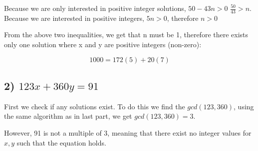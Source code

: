 \documentclass[12pt]{article} %
\begin{document}
\begin{homeworkProblem}
    Because we are only interested in positive integer solutions, $50 - 43n > 0$ $\frac{50}{43} > n$. Because we are interested in positive integers, $5n > 0$, therefore $n > 0$

    From the above two inequalities, we get that n must be 1, therefore there exists only one solution where x and y are positive integers (non-zero):

    $$
        1000 = 172(5) + 20(7)
    $$

    \subsection*{2) $123x + 360y = 91$}

    First we check if any solutions exist. To do this we find the $gcd(123, 360)$, using the same algorithm as in last part, we get $gcd(123, 360) = 3$.

    However, 91 is not a multiple of 3, meaning that there exist no integer values for $x, y$ such that the equation holds.
\end{homeworkProblem}

\pagebreak
\end{document}
